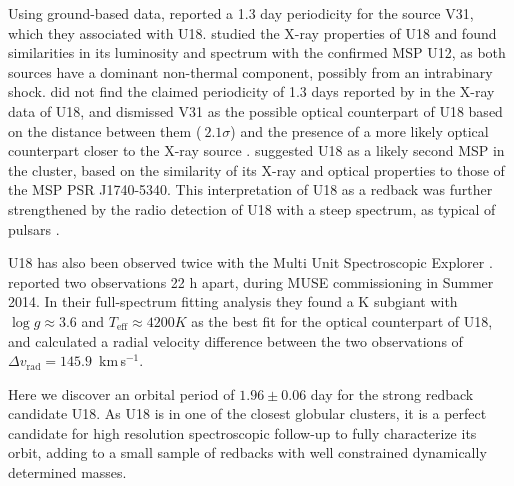\documentclass[fleqn,usenatbib,useAMS,letters]{mnras}
\newcommand{\kms}{\,km\,s$^{-1}$} %
\begin{document}
Using ground-based data, \cite{kaluzny_photometric_2006} reported a 1.3 day periodicity for the source V31, which they associated with U18. %
\cite{bogdanov_chandra_2010} studied the X-ray properties of U18 and found similarities in its luminosity and spectrum with the confirmed MSP U12, as both sources have a dominant non-thermal component, possibly from  an intrabinary shock.  \cite{bogdanov_chandra_2010} did not find the claimed periodicity of 1.3 days reported by \cite{kaluzny_photometric_2006} in the X-ray data of U18, and dismissed V31 as the possible optical counterpart of U18 based on the distance between them ($~2.1 \sigma$) and the presence of a more likely optical counterpart closer to the X-ray source \citep{grindlay_chandra_2001}. 
 \cite{bogdanov_chandra_2010} suggested U18 as a likely second MSP in the cluster, based on the similarity of its X-ray and optical properties to those of the MSP PSR J1740-5340. 
 This interpretation of U18 as a redback was further strengthened by %
the radio detection of U18 with a steep spectrum, as typical of pulsars 
\citep{CoryPaper}.

U18 has also been  observed twice with the Multi Unit Spectroscopic Explorer  \citep[MUSE][]{MUSECommissioning}. \cite{Husser2016MUSE}  reported two observations 22 h apart, during MUSE commissioning in Summer 2014. In their full-spectrum fitting analysis they found a K subgiant with  $\log g \approx 3.6$ and $T_{\text{eff}} \approx 4200 K$ as the best fit for the optical counterpart of U18, and calculated a radial velocity difference between the two observations of $ \Delta  v_{\text{rad}} =   145.9$ \kms. 



Here we %
discover an orbital period of $1.96 \pm 0.06$ day for the strong redback candidate U18.   As U18 is in one of the closest globular clusters, %
it is a perfect candidate for high resolution spectroscopic follow-up to fully characterize its orbit, adding to a small sample of redbacks with well constrained dynamically determined masses.
\end{document}
